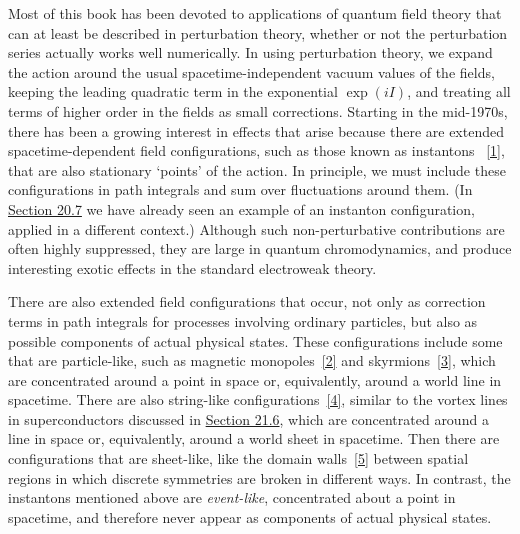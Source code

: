 
Most of this book has been devoted to applications of quantum field theory
that can at least be described in perturbation theory, whether or not the
perturbation series actually works well numerically. In using perturbation
theory, we expand the action around the usual spacetime-independent vacuum
values of the fields, keeping the leading quadratic term in the exponential
$\exp(iI)$, and treating all terms of higher order in the fields as small
corrections. Starting in the mid-1970s, there has been a growing interest in
effects that arise because there are extended spacetime-dependent field
configurations, such as those known as instantons%
~\hyperref[ch23-ref-1]{[1]}, that are also stationary `points' of the
action. In principle, we must include these configurations in path integrals
and sum over fluctuations around them. (In
\hyperref[sec:20.7]{Section 20.7} we have already seen an example of an
instanton configuration, applied in a different context.) Although such
non-perturbative contributions are often highly suppressed, they are large
in quantum chromodynamics, and produce interesting exotic effects in the
standard electroweak theory.

There are also extended field configurations that occur, not only as
correction terms in path integrals for processes involving ordinary
particles, but also as possible components of actual physical states. These
configurations include some that are particle-like, such as magnetic
monopoles~\hyperref[ch23-ref-2]{[2]} and
skyrmions~\hyperref[ch23-ref-3]{[3]}, which are concentrated around a point
in space or, equivalently, around a world line in spacetime. There are also
string-like configurations~\hyperref[ch23-ref-4]{[4]}, similar to the
vortex lines in superconductors discussed in
\hyperref[sec:21.6]{Section 21.6}, which are concentrated around a line in
space or, equivalently, around a world sheet in spacetime. Then there are
configurations that are sheet-like, like the domain
walls~\hyperref[ch23-ref-5]{[5]} between spatial regions in which discrete
symmetries are broken in different ways. In contrast, the instantons
mentioned above are \emph{event-like}, concentrated about a point in
spacetime, and therefore never appear as components of actual physical
states.

